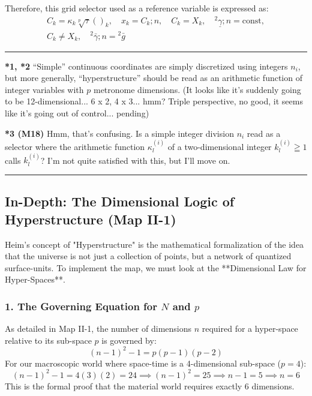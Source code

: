 \documentclass[11pt,a4paper,oneside]{article}
\newcommand{\hr}{\par\vspace{2em}\noindent\rule{\linewidth}{0.4pt}\par\vspace{2em}}
\begin{document}
Therefore, this grid selector used as a reference variable is expressed as:
\begin{equation}
    \begin{gathered}
C_k =\kappa_k\sqrt [p] {\tau}()_k, \quad x_k = C_k; n, \quad C_k = X_k, \quad {}^2\underline {\gamma}; n = \text{const}, \\
C_k\neq X_k, \quad {}^2\bar {\gamma}; n = {}^2\bar{g}
\end{gathered} \tag{M18b}
\end{equation}

\hr

\begin{reflectionbox}[title={Chat / Notes}]
    \textbf{*1, *2} ``Simple'' continuous coordinates are simply discretized using integers $n_i$, but more generally, ``hyperstructure'' should be read as an arithmetic function of integer variables with $p$ metronome dimensions. (It looks like it's suddenly going to be 12-dimensional... 6 x 2, 4 x 3... hmm? Triple perspective, no good, it seems like it's going out of control... pending)
    
    \textbf{*3 (M18)} Hmm, that's confusing. Is a simple integer division $n_i$ read as a selector where the arithmetic function $\kappa_l^{(i)}$ of a two-dimensional integer $k_l^{(i)} \geqq 1$ calls $k_l^{(i)} $?
    I'm not quite satisfied with this, but I'll move on.
\end{reflectionbox}

\hr

\subsection*{In-Depth: The Dimensional Logic of Hyperstructure (Map II-1)}

Heim’s concept of "Hyperstructure" is the mathematical formalization of the idea that the universe is not just a collection of points, but a network of quantized surface-units. To implement the map, we must look at the **Dimensional Law for Hyper-Spaces**.

\subsubsection*{1. The Governing Equation for $N$ and $p$}
As detailed in Map II-1, the number of dimensions $n$ required for a hyper-space relative to its sub-space $p$ is governed by:
\begin{equation}
    (n-1)^2 - 1 = p(p-1)(p-2) \tag{Dimensional law}
\end{equation}
For our macroscopic world where space-time is a 4-dimensional sub-space ($p=4$):
\begin{equation*}
    (n-1)^2 - 1 = 4(3)(2) = 24 \implies (n-1)^2 = 25 \implies n-1 = 5 \implies n = 6
\end{equation*}
This is the formal proof that the material world requires exactly 6 dimensions. 
\end{document}
